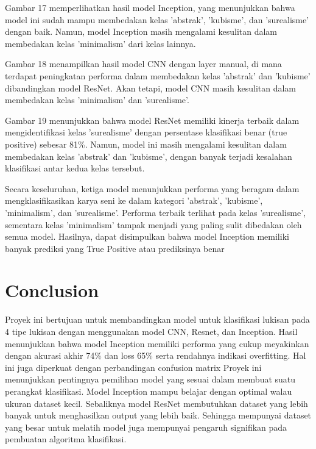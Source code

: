 \documentclass[12pt,a4paper]{article}
\begin{document}
Gambar 17 memperlihatkan hasil model Inception, yang menunjukkan bahwa model ini sudah mampu membedakan kelas 'abstrak', 'kubisme', dan 'surealisme' dengan baik. Namun, model Inception masih mengalami kesulitan dalam membedakan kelas 'minimalism' dari kelas lainnya.

Gambar 18 menampilkan hasil model CNN dengan layer manual, di mana terdapat peningkatan performa dalam membedakan kelas 'abstrak' dan 'kubisme' dibandingkan model ResNet. Akan tetapi, model CNN masih kesulitan dalam membedakan kelas 'minimalism' dan 'surealisme'.

Gambar 19 menunjukkan bahwa model ResNet memiliki kinerja terbaik dalam mengidentifikasi kelas 'surealisme' dengan persentase klasifikasi benar (true positive) sebesar 81\%. Namun, model ini masih mengalami kesulitan dalam membedakan kelas 'abstrak' dan 'kubisme', dengan banyak terjadi kesalahan klasifikasi antar kedua kelas tersebut.

Secara keseluruhan, ketiga model menunjukkan performa yang beragam dalam mengklasifikasikan karya seni ke dalam kategori 'abstrak', 'kubisme', 'minimalism', dan 'surealisme'. Performa terbaik terlihat pada kelas 'surealisme', sementara kelas 'minimalism' tampak menjadi yang paling sulit dibedakan oleh semua model. 
Hasilnya, dapat disimpulkan bahwa model Inception memiliki banyak prediksi yang True Positive atau prediksinya benar


\section{Conclusion}
Proyek ini bertujuan untuk membandingkan model untuk klasifikasi lukisan pada 4 tipe lukisan dengan menggunakan model CNN, Resnet, dan Inception. Hasil menunjukkan bahwa model Inception memiliki performa yang cukup meyakinkan dengan akurasi akhir 74\% dan loss 65\% serta rendahnya indikasi overfitting. Hal ini juga diperkuat dengan perbandingan confusion matrix
Proyek ini menunjukkan pentingnya pemilihan model yang sesuai dalam membuat suatu perangkat klasifikasi. Model Inception mampu belajar dengan optimal walau ukuran dataset kecil. Sebaliknya model ResNet membutuhkan dataset yang lebih banyak untuk menghasilkan output yang lebih baik. Sehingga mempunyai dataset yang besar untuk melatih model juga mempunyai pengaruh signifikan pada pembuatan algoritma klasifikasi.  
\end{document}
